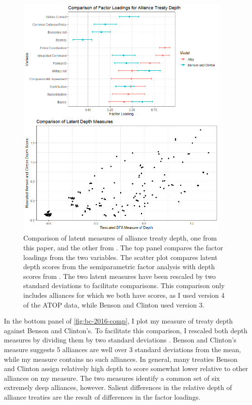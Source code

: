 \documentclass[12pt]{article}
\begin{document}
\begin{figure}[htbp]
	\centering
		\includegraphics[width=0.95\textwidth]{bc-2016-comp.png}
	\caption{Comparison of latent measures of alliance treaty depth, one from this paper, and the other from \citet{BensonClinton2016}. The top panel compares the factor loadings from the two variables. The scatter plot compares latent depth scores from the semiparametric factor analysis with depth scores from \citet{BensonClinton2016}. The two latent measures have been rescaled by two standard deviations to facilitate comparisons. This comparison only includes alliances for which we both have scores, as I used version 4 of the ATOP data, while Benson and Clinton used version 3.}
	\label{fig:bc-2016-comp}
\end{figure}


In the bottom panel of \autoref{fig:bc-2016-comp}, I plot my measure of treaty depth against Benson and Clinton's. 
To facilitate this comparison, I rescaled both depth measures by dividing them by two standard deviations \citep{Gelman2008}.
Benson and Clinton's measure suggests 5 alliances are well over 3 standard deviations from the mean, while my measure contains no such alliances. 
In general, many treaties Benson and Clinton assign relatively high depth to score somewhat lower relative to other alliances on my measure.
The two measures identify a common set of six extremely deep alliances, however. 
Salient differences in the relative depth of alliance treaties are the result of differences in the factor loadings. 
\end{document}
